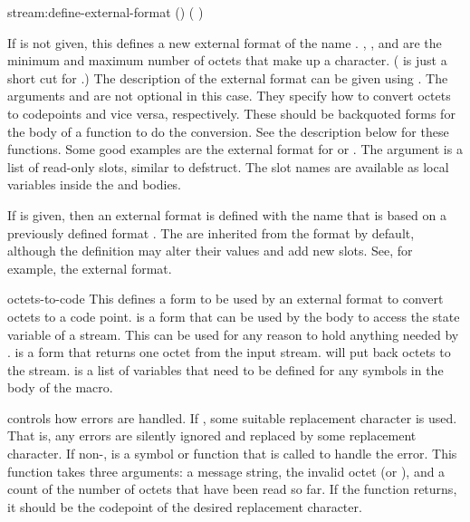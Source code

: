 \begin{defmac}[base]{stream:}{define-external-format}{\args {}
    ()
    (\amprest{} )
    }


  If  is not given, this defines a new external format of
  the name . , , and  are the
  minimum and maximum number of octets that make up a character.
  ( is just a short cut for .)  The description of the external format can be
  given using .  The arguments 
  and  are not optional in this case.  They
  specify how to convert octets to codepoints and vice versa,
  respectively.  These should be backquoted forms for the body of a
  function to do the conversion.  See the description below for these
  functions.  Some good examples are the external format for
   or .  The  argument is a list of
  read-only slots, similar to defstruct.  The slot names are available
  as local variables inside the  and
   bodies. 

  If  is given, then an external format is defined with the
  name  that is based on a previously defined format
  . The  are inherited from the  format
  by default, although the definition may alter their values and add
  new slots. See, for example, the  external format. 

\end{defmac}

\begin{defmac}{}{octets-to-code}{\args {} 
      \amprest{} }
  This defines a form to be used by an external format to convert
  octets to a code point.   is a form that can be used by
  the body to access the state variable of a stream.  This can be used
  for any reason to hold anything needed by .
   is a form that returns one octet from the input stream.
   will put back  octets to the stream.   is a
  list of variables that need to be defined for any symbols in the
  body of the macro.

   controls how errors are handled.  If \nil, some suitable
  replacement character is used.  That is, any errors are silently
  ignored and replaced by some replacement character.  If non-\nil,
   is a symbol or function that is called to handle the
  error.  This function takes three arguments: a message string, the
  invalid octet (or \nil), and a count of the number of octets that
  have been read so far.  If the function returns, it should be the
  codepoint of the desired replacement character.
\end{defmac}

